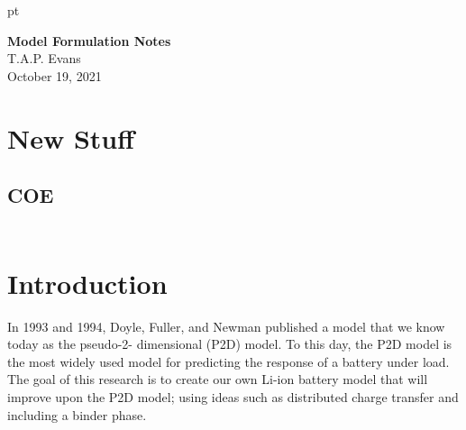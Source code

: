 \documentclass[12pt]{article}
\begin{document}

	 pt
	
	\begin{center}
		{\large\bf Model Formulation Notes}\\
		T.A.P. Evans\\
		October 19, 2021
	\end{center}

\section{New Stuff}
	\subsection{COE}
		\begin{gather}
			
		\end{gather}
\section{Introduction}
	In 1993 and 1994, Doyle, Fuller, and Newman \cite{DFN93,FDN94} published a model that we know today as the pseudo-2- dimensional (P2D) model. To this day, the P2D model is the most widely used model for predicting the response of a battery under load. The goal of this research is to create our own Li-ion battery model that will improve upon the P2D model; using ideas such as distributed charge transfer and including a binder phase. 
\end{document}
